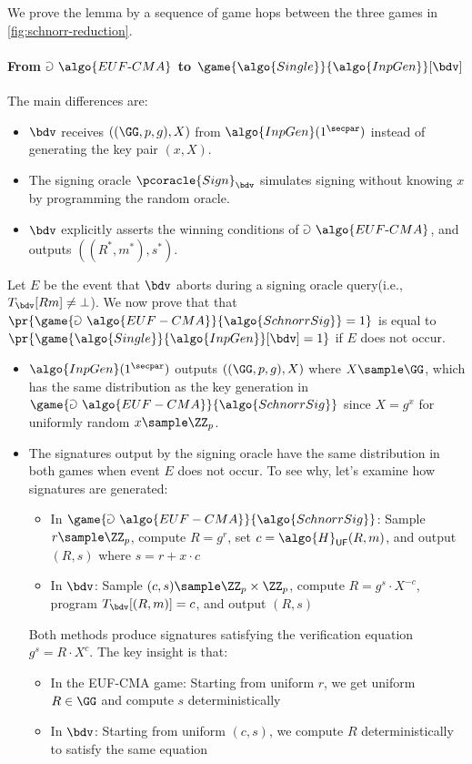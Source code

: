\ifsolutions
\begin{mysolution}
  We prove the lemma by a sequence of game hops between the three games in \autoref{fig:schnorr-reduction}.

  \paragraph{From $\Game~\algo{EUF\text{-}CMA}$ to $\game{\algo{Single}}{\algo{InpGen}}[\bdv]$}
  The main differences are:
  \begin{itemize}
    \item $\bdv$ receives $((\GG, p, g), X)$ from $\algo{InpGen}(1^\secpar)$ instead of generating the key pair $(x, X)$.
    \item The signing oracle $\pcoracle{Sign}_{\bdv}$ simulates signing without knowing $x$ by programming the random oracle.
    \item $\bdv$ explicitly asserts the winning conditions of $\Game~\algo{EUF\text{-}CMA}$, and outputs $((R^*, m^*), s^*)$.
  \end{itemize}

  Let $E$ be the event that $\bdv$ aborts during a signing oracle query(i.e., $T_{\bdv}[R  m] \neq \bot$).
  We now prove that that $\pr{\game{\Game~\algo{EUF-CMA}}{\algo{SchnorrSig}} = 1}$ is equal to $\pr{\game{\algo{Single}}{\algo{InpGen}}[\bdv] = 1}$ if $E$ does not occur.
  \begin{itemize}
    \item $\algo{InpGen}(1^\secpar)$ outputs $((\GG, p, g), X)$ where $X \sample \GG$, which has the same distribution as the key generation in $\game{\Game~\algo{EUF-CMA}}{\algo{SchnorrSig}}$ since $X = g^x$ for uniformly random $x \sample \ZZ_p$.
    \item The signatures output by the signing oracle have the same distribution in both games when event $E$ does not occur. To see why, let's examine how signatures are generated:
    \begin{itemize}
      \item In $\game{\Game~\algo{EUF-CMA}}{\algo{SchnorrSig}}$: Sample $r \sample \ZZ_p$, compute $R = g^r$, set $c = \algo{H}_{\mathsf{UF}}(R, m)$, and output $(R,
  s)$ where $s = r + x \cdot c$
      \item In $\bdv$: Sample $(c, s) \sample \ZZ_p \times \ZZ_p$, compute $R = g^s \cdot X^{-c}$, program $T_{\bdv}[(R, m)] = c$, and output $(R, s)$
    \end{itemize}

    Both methods produce signatures satisfying the verification equation $g^s = R \cdot X^c$. The key insight is that:
    \begin{itemize}
      \item In the EUF-CMA game: Starting from uniform $r$, we get uniform $R \in \GG$ and compute $s$ deterministically
      \item In $\bdv$: Starting from uniform $(c, s)$, we compute $R$ deterministically to satisfy the same equation
    \end{itemize}


\end{itemize}
\end{mysolution}
